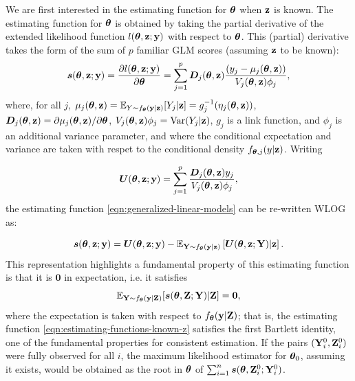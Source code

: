 \documentclass[twoside,11pt]{article}
\newcommand{\gb}[2][]{\todo[color=gbcolor, caption={GB}, #1]{#2}}
\begin{document}
We are first interested in the estimating function for ${\bm{\theta}}$ when ${\bf z}$ is known. The estimating function for ${\bm{\theta}}$ is obtained by taking the partial derivative of the extended likelihood function $l({\bm{\theta}}, {\bf z}; {\bf y})$ with respect to ${\bm{\theta}}$. This (partial) derivative takes the form of the sum of $p$ familiar GLM scores (assuming ${\bf z}$ to be known):
%
\begin{equation}
\bm s({\bm{\theta}}, {\bf z}; {\bf y}) = \frac{\partial l({\bm{\theta}}, {\bf z};{\bf y})}{\partial {\bm{\theta}}}=\sum_{j=1}^p \bm D_j({\bm{\theta}}, {\bf z})\frac{(y_{j} - \mu_j({\bm{\theta}}, {\bf z}))}{V_j({\bm{\theta}}, {\bf z})\phi_j},
    \label{eqn:generalized-linear-models}
\end{equation}
%
%
where, for all $j$, $\mu_j({\bm{\theta}}, {\bf z}) = \mathbb{E}_{Y\sim f_{\bm{\theta}}({\bf y}|{\bf z})}[Y_{j}|{\bf z}] = g_j^{-1}(\eta_j({\bm{\theta}}, {\bf z}))$, $\bm D_j({\bm{\theta}}, {\bf z}) = \partial \mu_j({\bm{\theta}}, {\bf z})/\partial {\bm{\theta}}$, $V_j({\bm{\theta}}, {\bf z})\phi_j = \text{Var}(Y_{j}|{\bf z})$, $g_j$ is a link function, and $\phi_j$ is an additional variance parameter, and where the conditional expectation and variance are taken with respet to the conditional density $f_{{\bm{\theta}},j}(y|{\bf z})$. Writing

\begin{equation}
    \bm U({\bm{\theta}}, {\bf z};{\bf y}) = \sum_{j=1}^p\frac{\bm D_j({\bm{\theta}}, {\bf z}) y_{j} }{V_j({\bm{\theta}}, {\bf z})\phi_j},
    \label{eqn:Psi}
\end{equation}
%
the estimating function \eqref{eqn:generalized-linear-models} can be re-written WLOG as:

%
\begin{equation}
\bm s({\bm{\theta}}, {\bf z}; {\bf y}) = \bm U({\bm{\theta}}, {\bf z}; {\bf y}) - \mathbb{E}_{{\bf Y}\sim f_{{\bm{\theta}}}({\bf y}|{\bf z})}\left[\bm U({\bm{\theta}}, {\bf z}; {\bf Y})\Large\vert{\bf z} \right].
\label{eqn:estimating-functions-known-z}
\end{equation}
%
This representation highlights a fundamental property of this estimating function is that it is $\bm 0$ in expectation, i.e. it satisfies
%
$$
\mathbb{E}_{{\bf Y} \sim f_{\bm{\theta}}({\bf y}|{\bf Z})}[\bm s({\bm{\theta}}, {\bf Z}; {\bf Y})|{\bf Z}] = \bm 0,
$$
%
where the expectation is taken with respect to $f_{\bm{\theta}}({\bf y}|{\bf Z})$; that is, the estimating function \eqref{eqn:estimating-functions-known-z} satisfies the first Bartlett identity, one of the fundamental properties for consistent estimation. If the pairs $({\bf Y}_i^0, {\bf Z}_i^0)$ were fully observed for all $i$, the maximum likelihood estimator for ${\bm{\theta}}_0$, assuming it exists, would be obtained as the root in ${\bm{\theta}}$ of
%
$\sum_{i=1}^n \bm s({\bm{\theta}}, {\bf Z}_i^0; {\bf Y}_i^0)$.
%
\end{document}
